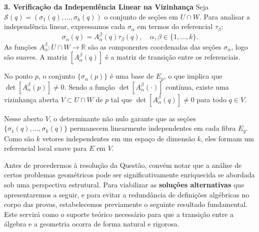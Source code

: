 {	\textbf{3. Verificação da Independência Linear na Vizinhança}
	Seja $\mathcal{S}(q) = (\sigma_1(q), \dots, \sigma_k(q))$ o conjunto de seções em $U \cap W$. Para analisar a independência linear, expressamos cada $\sigma_\alpha$ em termos do referencial $\tau_\beta$:
	\begin{equation*}
		\sigma_\alpha(q) = A^\beta_\alpha(q) \tau_\beta(q), \quad \alpha, \beta \in \{1, \dots, k\}.
	\end{equation*}
	As funções $A^\beta_\alpha : U \cap W \to \mathbb{R}$ são as componentes coordenadas das seções $\sigma_\alpha$, logo são suaves. A matriz $[A^\beta_\alpha(q)]$ é a matriz de transição entre os referenciais. 
	
	No ponto $p$, o conjunto $\{\sigma_\alpha(p)\}$ é uma base de $E_p$, o que implica que $\det[A^\beta_\alpha(p)] \neq 0$. Sendo a função $\det[A^\beta_\alpha(\cdot)]$ contínua, existe uma vizinhança aberta $V \subset U \cap W$ de $p$ tal que $\det[A^\beta_\alpha(q)] \neq 0$ para todo $q \in V$. 
	
	Nesse aberto $V$, o determinante não nulo garante que as seções $\{\sigma_1(q), \dots, \sigma_k(q)\}$ permanecem linearmente independentes em cada fibra $E_q$. Como são $k$ vetores independentes em um espaço de dimensão $k$, eles formam um referencial local suave para $E$ em $V$.
}

Antes de procedermos à resolução da Questão, convém notar que a análise de certos problemas geométricos pode ser significativamente enriquecida se abordada sob uma perspectiva estrutural. Para viabilizar as \textbf{soluções alternativas} que apresentaremos a seguir, e para evitar a redundância de definições algébricas no corpo das provas, estabelecemos previamente o seguinte resultado fundamental. Este servirá como o suporte teórico necessário para que a transição entre a álgebra e a geometria ocorra de forma natural e rigorosa.

